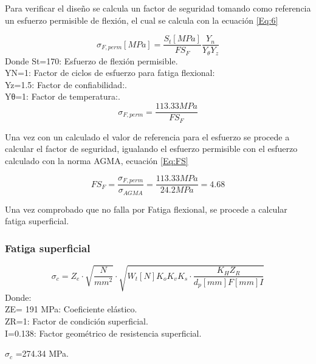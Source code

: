 Para verificar el diseño se calcula un factor de seguridad tomando como referencia un esfuerzo permisible de flexión, el cual se calcula con la ecuación \ref{Eq:6}

\begin{equation}
 \sigma_{F,perm}[MPa]=\frac{S_{t}[MPa]}{FS_{F}}  \frac{Y_{n}}{Y_{\theta}Y_{z}} 
\label{Eq:6}    
\end{equation}
Donde 
St=170: Esfuerzo de flexión permisible.\\
YN=1: Factor de ciclos de esfuerzo para fatiga flexional: \\
Yz=1.5: Factor de confiabilidad:.\\
Yθ=1: Factor de temperatura:.\\

\begin{equation}
 \sigma_{F,perm}=\frac{113.33  MPa}{FS_{F}}  
\label{Eq:sagama}    
\end{equation}

Una vez con un calculado el valor de referencia para el esfuerzo se procede a calcular el factor de seguridad, igualando el esfuerzo permisible con el esfuerzo calculado con la norma AGMA, ecuación \ref{Eq:FS}

\begin{equation}
 {FS_{F}}=\frac{\sigma_{F,perm}}{\sigma_{AGMA}} =\frac{113.33  MPa}{24.2 MPa} = 4.68 
\label{Eq:FS}    
\end{equation}



Una vez comprobado que no falla por Fatiga flexional, se procede a calcular fatiga superficial.
\subsubsection*{Fatiga superficial}
\begin{equation}
 \sigma_{c}=Z_{e}\cdot \sqrt{\frac{N}{mm^{2}}} \cdot \sqrt{W_{t}[N]K_{o}K_{v}K_{s} \cdot \frac{K_{H}Z_{R}}{d_{p}[mm]F[mm]I}}
\label{Eq:7}    
\end{equation}
Donde: \\
ZE= 191 MPa: Coeficiente elástico.\\
ZR=1: Factor de condición superficial.\\
I=0.138: Factor geométrico de resistencia superficial.
\begin{center}
$\sigma_{c}$ =274.34 MPa.

\end{center}


